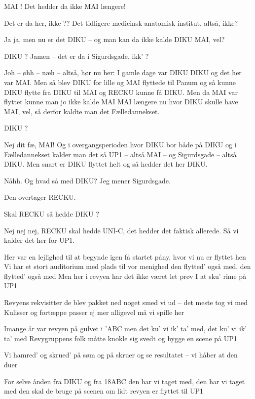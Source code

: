 \documentclass[a4paper,11pt]{article}
\begin{document}
\begin{sketch}

 MAI ! Det hedder da ikke MAI længere!

 Det er da her, ikke ??  Det tidligere medicinsk-anatomisk institut,
altså, ikke?

 Ja ja, men nu er det DIKU -- og man kan da ikke kalde DIKU MAI, vel?

 DIKU ? Jamen -- det er da i Sigurdsgade, ikk' ?

 Joh -- øhh -- næh -- altså, hør nu her: I gamle dage var DIKU DIKU og
det her var MAI. Men så blev DIKU for lille og MAI flyttede til Panum og så
kunne DIKU flytte fra DIKU til MAI og RECKU kunne få DIKU. Men da MAI var
flyttet kunne man jo ikke kalde MAI MAI længere nu hvor DIKU skulle have MAI,
vel, så derfor kaldte man det Fælledannekset.

 DIKU ?

 Nej dit fæ, MAI!  Og i overgangsperioden hvor DIKU bor både på DIKU og
i Fælledannekset kalder man det så UP1 -- altså MAI -- og Sigurdsgade -- altså
DIKU. Men snart er DIKU flyttet helt og så hedder det her DIKU.

 Nåhh. Og hvad så med DIKU? Jeg mener Sigurdsgade.

 Den overtager RECKU.

 Skal RECKU så hedde DIKU ?

 Nej nej nej, RECKU skal hedde UNI-C, det hedder det faktisk
allerede. Så vi kalder det her for UP1. 

\end{sketch}


\begin{song}
 Her var en lejlighed til at begynde igen
 få startet påny, hvor vi nu er flyttet hen
Vi har et stort auditorium med plads til vor menighed
den flytted' også med, den flytted' også med
Men her i revyen har det ikke været let
prøv I at sku' rime på UP1


 Revyens rekvisitter de blev pakket ned
 noget smed vi ud -- det meste tog vi med
 Kulisser og fortæppe passer ej mer
 alligevel må vi spille her

Imange år var revyen på gulvet i 'ABC
men det ku' vi ik' ta' med, det ku' vi ik' ta' med
Revygruppens folk måtte knokle sig svedt
og bygge en scene på UP1

 Vi hamred' og skrued' på søm og på skruer
 og se resultatet -- vi håber at den duer

For selve ånden fra DIKU og fra 18ABC
den har vi taget med, den har vi taget med
den skal de bruge på scenen om lidt
revyen er flyttet til UP1

\end{song}
\end{document}
